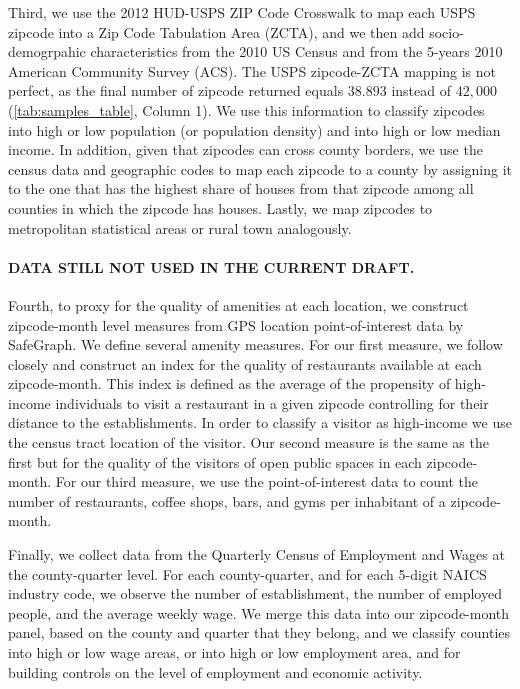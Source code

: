 Third, we use the 2012 HUD-USPS ZIP Code Crosswalk to map each USPS zipcode into a Zip Code Tabulation Area (ZCTA), and we then add socio-demogrpahic characteristics from the 2010 US Census and from the 5-years 2010 American Community Survey (ACS). The USPS zipcode-ZCTA mapping is not perfect, as the final number of zipcode returned equals $38.893$ instead of $42,000$ (\autoref{tab:samples_table}, Column 1). We use this information to classify zipcodes into high or low population (or population density) and into high or low median income. In addition, given that zipcodes can cross county borders, we use the census data and geographic codes to map each zipcode to a county by assigning it to the one that has the highest share of houses from that zipcode among all counties in which the zipcode has houses. Lastly, we map zipcodes to metropolitan statistical areas or rural town analogously.

\paragraph{DATA STILL NOT USED IN THE CURRENT DRAFT.}
Fourth, to proxy for the quality of amenities at each location, we construct zipcode-month level measures from GPS location point-of-interest data by SafeGraph\parencite{safegraph}. We define several amenity measures. For our first measure, we follow closely \textcite{couture2019income} and construct an index for the quality of restaurants available at each zipcode-month. This index is defined as the average of the propensity of high-income individuals to visit a restaurant in a given zipcode controlling for their distance to the establishments. In order to classify a visitor as high-income we use the census tract location of the visitor. Our second measure is the same as the first but for the quality of the visitors of open public spaces in each zipcode-month. For our third measure, we use the point-of-interest data to count the number of restaurants, coffee shops, bars, and gyms per inhabitant of a zipcode-month. 

Finally, we collect data from the Quarterly Census of Employment and Wages at the county-quarter level. For each county-quarter, and for each 5-digit NAICS industry code, we observe the number of establishment, the number of employed people, and the average weekly wage. We merge this data into our zipcode-month panel, based on the county and quarter that they belong, and we classify counties into high or low wage areas, or into high or low employment area, and for building controls on the level of employment and economic activity. 


